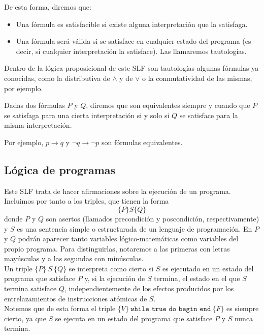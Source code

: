 De esta forma, diremos que:
\begin{itemize}
    \item Una fórmula es satisfacible si existe alguna interpretación que la satisfaga.
    \item Una fórmula será válida si se satisface en cualquier estado del programa (es decir, si cualquier interpretación la satisface). Las llamaremos tautologías.
\end{itemize}

Dentro de la lógica proposicional de este SLF son tautologías algunas fórmulas ya conocidas, como la distributiva de $\land$ y de $\lor$ o la conmutatividad de las mismas, por ejemplo.

\begin{definicion}
    Dadas dos fórmulas $P$ y $Q$, diremos que son equivalentes siempre y cuando que $P$ se satisfaga para una cierta interpretación si y solo si $Q$ se satisface para la misma interpretación.
\end{definicion}
Por ejemplo, $p\rightarrow q$ y $\lnot q\rightarrow \lnot p$ son fórmulas equivalentes.

\subsection{Lógica de programas}
Este SLF trata de hacer afirmaciones sobre la ejecución de un programa. Incluimos por tanto a los triples, que tienen la forma
\begin{equation*}
    \{P\}S\{Q\}
\end{equation*}
donde $P$ y $Q$ son asertos (llamados precondición y poscondición, respectivamente) y $S$ es una sentencia simple o estructurada de un lenguaje de programación. En $P$ y $Q$ podrán aparecer tanto variables lógico-matemáticas como variables del propio programa. Para distinguirlas, notaremos a las primeras con letras mayúsculas y a las segundas con minúsculas.\\

Un triple $\{P\}\ S\ \{Q\}$ se interpreta como cierto si $S$ es ejecutado en un estado del programa que satisface $P$ y, si la ejecución de $S$ termina, el estado en el que $S$ termina satisface $Q$, independientemente de los efectos producidos por los entrelazamientos de instrucciones atómicas de $S$.\\

Notemos que de esta forma el triple $\{V\}\ \texttt{while\ true\ do\ begin\ end}\ \{F\}$ es siempre cierto, ya que $S$ se ejecuta en un estado del programa que satisface $P$ y $S$ nunca termina.

